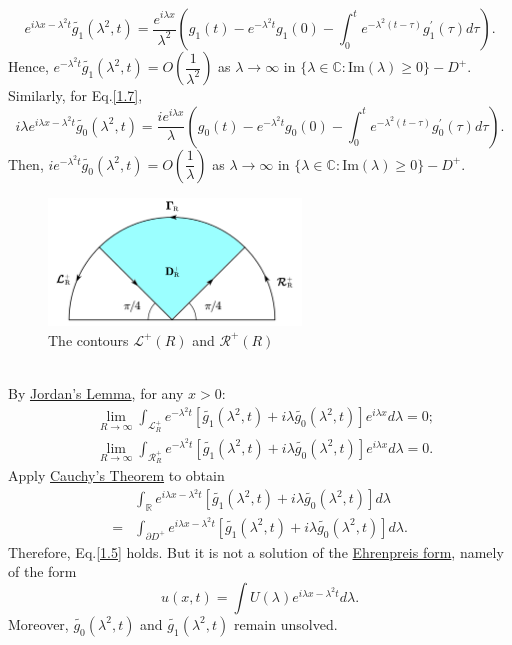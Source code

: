 \documentclass[12pt]{article}
\numberwithin{equation}{section}
\begin{document}
\begin{equation*}
    e^{i\lambda x-\lambda^2 t}\tilde{g_1}(\lambda^2,t)=\dfrac{e^{i\lambda x}}{\lambda^2}\left(g_1(t)-e^{-\lambda^2 t}g_1(0)-\int_{0}^{t}e^{-\lambda^2(t-\tau)}g^{\prime}_1(\tau)d\tau\right).
\end{equation*}
Hence, $e^{-\lambda^2 t}\tilde{g_1}(\lambda^2,t)=O\left(\dfrac{1}{\lambda^2}\right)$ as $\lambda\to\infty$ in $\{\lambda\in\mathbb{C}:\text{Im}(\lambda)\geqslant 0\}-D^+$. Similarly, for Eq.\eqref{1.7},
\begin{equation*}
    i\lambda e^{i\lambda x-\lambda^2 t}\tilde{g_0}(\lambda^2,t)=\dfrac{ie^{i\lambda x}}{\lambda}\left(g_0(t)-e^{-\lambda^2 t}g_0(0)-\int_{0}^{t}e^{-\lambda^2(t-\tau)}g^{\prime}_0(\tau)d\tau\right).
\end{equation*}
Then, $ie^{-\lambda^2 t}\tilde{g_0}(\lambda^2,t)=O\left(\dfrac{1}{\lambda}\right)$ as $\lambda\to\infty$ in $\{\lambda\in\mathbb{C}:\text{Im}(\lambda)\geqslant 0\}-D^+$.
\begin{figure}[h]
    \centering \hspace{5mm}
    \includegraphics[width=0.60\textwidth]{344821711499232_.pic_hd.jpg}
    \caption{The contours $\mathcal{L}^{+}(R)$ and $\mathcal{R}^{+}(R)$}
    \label{3}
\end{figure}\\
By \href{https://w.wiki/9aSw}{Jordan's Lemma}, for any $x>0$:
\begin{align*}
    &\lim\limits_{R\to\infty} \int_{\mathcal{L}^+_{R}} e^{-\lambda^2 t}[\tilde{g_1}(\lambda^2,t)+i\lambda\tilde{g_0}(\lambda^2,t)]e^{i\lambda x}d\lambda=0;\\
    &\lim\limits_{R\to\infty} \int_{\mathcal{R}^+_{R}} e^{-\lambda^2 t}[\tilde{g_1}(\lambda^2,t)+i\lambda\tilde{g_0}(\lambda^2,t)]e^{i\lambda x}d\lambda=0.
\end{align*}
Apply \href{https://w.wiki/9aTM}{Cauchy's Theorem} to obtain
\begin{align*}
    &\int_{\mathbb{R}}e^{i\lambda x-\lambda^2 t}[\tilde{g_1}(\lambda^2,t)+i\lambda \tilde{g_0}(\lambda^2,t)]d\lambda\\
    =&\int_{\partial D^+}e^{i\lambda x-\lambda^2 t}[\tilde{g_1}(\lambda^2,t)+i\lambda \tilde{g_0}(\lambda^2,t)]d\lambda.
\end{align*}
Therefore, Eq.\eqref{1.5} holds. But it is not a solution of the \href{https://w.wiki/9aTe}{Ehrenpreis form}, namely of the form
\begin{equation}\label{1.8}
    u(x,t)=\int U(\lambda)e^{i\lambda x-\lambda^2 t} d\lambda.
\end{equation}
Moreover, $\tilde{g_0}(\lambda^2,t)$ and $\tilde{g_1}(\lambda^2,t)$ remain unsolved.
\end{document}
